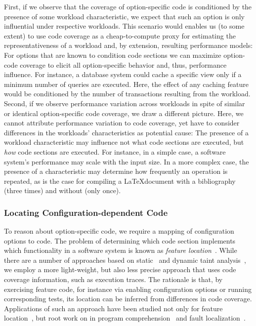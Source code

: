 {First, if we observe that the  coverage of option-specific code is conditioned by the presence of some workload characteristic, we expect that such an option is only influential under respective workloads. This scenario would enables us (to some extent) to use code coverage as a cheap-to-compute proxy for estimating the representativeness of a workload and, by extension, resulting performance models: For options that are known to condition code sections we can maximize option-code coverage to elicit all option-specific behavior and, thus, performance influence. For instance, a database system could cache a specific view only if a minimum number of queries are executed. Here, the effect of any caching feature would be conditioned by the number of transactions resulting from the workload.
Second, if we observe performance variation across workloads in spite of similar or identical option-specific code coverage, we draw a different picture. Here, we cannot attribute performance variation to code coverage, yet have to consider differences in the workloads’ characteristics as potential cause: The presence of a workload characteristic may influence not {what} code sections are executed, but \emph{how} code sections are executed. For instance, in a simple case, a software system’s performance may scale with the input size. In a more complex case, the presence of a characteristic may determine how frequently an operation is repeated, as is the case for compiling a \LaTeX document with a bibliography (three times) and without (only once).

\subsubsection{Locating Configuration-dependent Code}
To reason about option-specific code, we require a mapping of configuration options to code. 
The problem of determining which code section implements which functionality in a software system is known as \emph{feature location}~\cite{rubin_feature_2013}. 
While there are a number of approaches based on static~\cite{velez_2020_configcrusher_jase,lillack_2018_lotrack_tse,luo_2019_cova} and dynamic taint analysis~\cite{bell_phosphor_2014,velez_comprex_2021,splat_kim_2013}, we employ a more light-weight,  but also less precise approach that uses code coverage information, such as execution traces.
The rationale is that, by exercising feature code, for instance via enabling configuration options or running corresponding tests, its location can be inferred from differences in code coverage. 
Applications of such an approach have been studied not only for feature location~\cite{wong_integrated_2005,sulir_annotation_2015,michelon_spectrum_2021,perez_framing_2016}, but root work on in program comprehension~\cite{wilde_early_1996,wilde_reconnaissance_1995,sherwood_reducing_nodate,perez_diagnosis_2014,castro_pangolin_2019} and fault localization~\cite{agrawal_fault_1995,wong_faultloc_2016}. 
}
